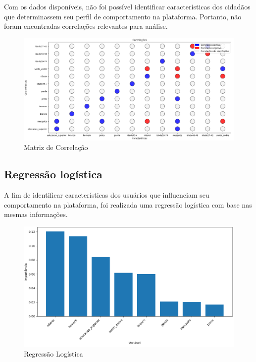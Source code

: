 Com os dados disponíveis, não foi possível identificar características dos cidadãos que determinassem seu perfil de comportamento na plataforma. Portanto, não foram encontradas correlações relevantes para análise.

\begin{figure}[!htb]
	\caption{Matriz de Correlação}
	\label{fig:colab_correlation_bingo}
	\centering
	\includegraphics[scale=0.4]{images/colab_correlation_bingo.png}
\end{figure}

\subsection*{Regressão logística}

A fim de identificar características dos usuários que influenciam seu comportamento na plataforma, foi realizada uma regressão logística com base nas mesmas informações.

\begin{figure}[!htb]
	\caption{Regressão Logística}
	\label{fig:regression_chart}
	\centering
	\includegraphics[scale=0.6]{images/regression_chart.png}
\end{figure}

